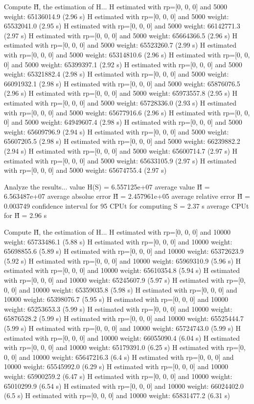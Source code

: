Compute H̃, the estimation of H...
  H estimated with rp=[0, 0, 0] and 5000 weight:  65136014.9  (2.96 s)
  H estimated with rp=[0, 0, 0] and 5000 weight:  65532041.0  (2.95 s)
  H estimated with rp=[0, 0, 0] and 5000 weight:  66142771.3  (2.97 s)
  H estimated with rp=[0, 0, 0] and 5000 weight:  65664366.5  (2.96 s)
  H estimated with rp=[0, 0, 0] and 5000 weight:  65523260.7  (2.99 s)
  H estimated with rp=[0, 0, 0] and 5000 weight:  65314810.6  (2.96 s)
  H estimated with rp=[0, 0, 0] and 5000 weight:  65399397.1  (2.92 s)
  H estimated with rp=[0, 0, 0] and 5000 weight:  65321882.4  (2.98 s)
  H estimated with rp=[0, 0, 0] and 5000 weight:  66091932.1  (2.98 s)
  H estimated with rp=[0, 0, 0] and 5000 weight:  65876076.5  (2.96 s)
  H estimated with rp=[0, 0, 0] and 5000 weight:  65973557.8  (2.95 s)
  H estimated with rp=[0, 0, 0] and 5000 weight:  65728336.0  (2.93 s)
  H estimated with rp=[0, 0, 0] and 5000 weight:  65677916.6  (2.96 s)
  H estimated with rp=[0, 0, 0] and 5000 weight:  64949607.4  (2.98 s)
  H estimated with rp=[0, 0, 0] and 5000 weight:  65609796.9  (2.94 s)
  H estimated with rp=[0, 0, 0] and 5000 weight:  65607205.5  (2.98 s)
  H estimated with rp=[0, 0, 0] and 5000 weight:  66239882.2  (2.94 s)
  H estimated with rp=[0, 0, 0] and 5000 weight:  65600714.7  (2.97 s)
  H estimated with rp=[0, 0, 0] and 5000 weight:  65633105.9  (2.97 s)
  H estimated with rp=[0, 0, 0] and 5000 weight:  65674755.4  (2.97 s)

Analyze the results...
  value H(S)                  = 6.557125e+07 
  average value H̃             = 6.563487e+07 
  average absolue error H̃     = 2.457961e+05 
  average relative error H̃    = 0.003749 
  confidence interval for 95%
  CPUt for computing S         = 2.37 s
  average CPUt for H̃           = 2.96 s

Compute H̃, the estimation of H...
  H estimated with rp=[0, 0, 0] and 10000 weight:  65733486.1  (5.88 s)
  H estimated with rp=[0, 0, 0] and 10000 weight:  65698855.6  (5.89 s)
  H estimated with rp=[0, 0, 0] and 10000 weight:  65372623.9  (5.92 s)
  H estimated with rp=[0, 0, 0] and 10000 weight:  65969310.9  (5.96 s)
  H estimated with rp=[0, 0, 0] and 10000 weight:  65610354.8  (5.94 s)
  H estimated with rp=[0, 0, 0] and 10000 weight:  65245607.9  (5.97 s)
  H estimated with rp=[0, 0, 0] and 10000 weight:  65359035.8  (5.98 s)
  H estimated with rp=[0, 0, 0] and 10000 weight:  65398076.7  (5.95 s)
  H estimated with rp=[0, 0, 0] and 10000 weight:  65253653.3  (5.99 s)
  H estimated with rp=[0, 0, 0] and 10000 weight:  65876528.2  (5.99 s)
  H estimated with rp=[0, 0, 0] and 10000 weight:  65525444.7  (5.99 s)
  H estimated with rp=[0, 0, 0] and 10000 weight:  65724743.0  (5.99 s)
  H estimated with rp=[0, 0, 0] and 10000 weight:  66055090.4  (6.04 s)
  H estimated with rp=[0, 0, 0] and 10000 weight:  65179391.0  (6.25 s)
  H estimated with rp=[0, 0, 0] and 10000 weight:  65647216.3  (6.4 s)
  H estimated with rp=[0, 0, 0] and 10000 weight:  65545992.0  (6.29 s)
  H estimated with rp=[0, 0, 0] and 10000 weight:  65900259.2  (6.47 s)
  H estimated with rp=[0, 0, 0] and 10000 weight:  65010299.9  (6.54 s)
  H estimated with rp=[0, 0, 0] and 10000 weight:  66024402.0  (6.5 s)
  H estimated with rp=[0, 0, 0] and 10000 weight:  65831477.2  (6.31 s)

